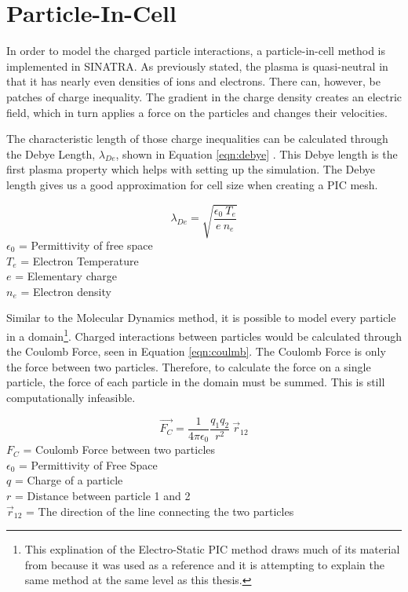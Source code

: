 
\section{Particle-In-Cell}

In order to model the charged particle interactions, a particle-in-cell method is implemented in SINATRA. As previously stated, the plasma is quasi-neutral in that it has nearly even densities of ions and electrons. There can, however, be patches of charge inequality. The gradient in the charge density creates an electric field, which in turn applies a force on the particles and changes their velocities. \par


The characteristic length of those charge inequalities can be calculated through the Debye Length, \(\lambda_{De}\), shown in Equation \ref{eqn:debye} \cite{debye}. This Debye length is the first plasma property which helps with setting up the simulation. The Debye length gives us a good approximation for cell size when creating a PIC mesh.

\begin{equation}
    \label{eqn:debye}
    \lambda_{De} = \sqrt{\frac{\epsilon_0 \: T_e}{e \: n_e}}
\end{equation}
\(\epsilon_0\) = Permittivity of free space \\
\(T_e\) = Electron Temperature \\
\(e\) = Elementary charge \\
\(n_e\) = Electron density \par

 



\indent Similar to the Molecular Dynamics method, it is possible to model every particle in a domain\footnote{This explination of the Electro-Static PIC method draws much of its material from \cite{es-pic} because it was used as a reference and it is attempting to explain the same method at the same level as this thesis.}. Charged interactions between particles would be calculated through the Coulomb Force, seen in Equation \ref{eqn:coulmb}. The Coulomb Force is only the force between two particles. Therefore, to calculate the force on a single particle, the force of each particle in the domain must be summed. This is still computationally infeasible. \par 

\begin{equation}
    \label{eqn:coulmb}
    \vec{F_C} = \frac{1}{4 \pi \epsilon_0} \frac{q_1 q_2}{r^2}  \: \vec{r}_{12}
\end{equation}
\(F_C\) = Coulomb Force between two particles \\
\(\epsilon_0\) = Permittivity of Free Space \\
\(q\) = Charge of a particle \\
\(r\) = Distance between particle 1 and 2 \\
\(\vec{r}_{12}\) = The direction of the line connecting the two particles \par


